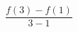 \documentclass[preview]{standalone}
\begin{document}
\begin{align*}
\dfrac{f(3) - f(1)}{3 - 1}
\end{align*}
\end{document}
